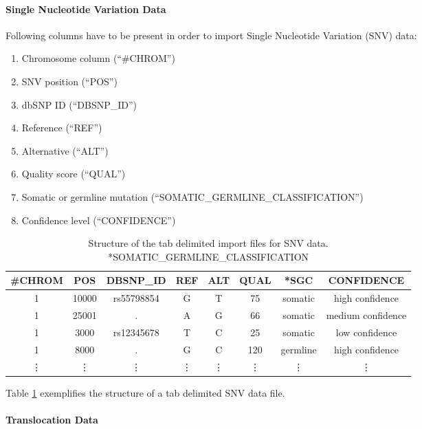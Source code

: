 \documentclass[11pt,final]{article}
\begin{document}
\paragraph{Single Nucleotide Variation Data}

Following columns have to be present in order to import Single Nucleotide
Variation (SNV) data:

\begin{enumerate}
  \item Chromosome column (``\#CHROM'')
  \item SNV position (``POS'')
  \item dbSNP ID (``DBSNP\_ID'')
  \item Reference (``REF'')
  \item Alternative (``ALT'')
  \item Quality score (``QUAL'')
  \item Somatic or germline mutation (``SOMATIC\_GERMLINE\_CLASSIFICATION'')
  \item Confidence level (``CONFIDENCE'')
\end{enumerate}

\begin{table}
	\centering
	\begin{tabular}[h]{|c|c|c|c|c|c|c|c|}
	  \hline
	  \#CHROM & POS & DBSNP\_ID & REF & ALT & QUAL & {*}SGC & CONFIDENCE \\ \hline
	 1 & 10000 & rs55798854 & G & T & 75 & somatic & high confidence\\
         1 & 25001 & . & A & G & 66 & somatic & medium confidence\\
         1 & 3000 & rs12345678 & T & C & 25 & somatic & low confidence\\
         1 & 8000 & . & G & C & 120 & germline & high confidence\\
	\vdots & \vdots & \vdots & \vdots & \vdots & \vdots & \vdots & \vdots \\
	\end{tabular}
	\caption{Structure of the tab delimited import files for SNV data.
	{*}SOMATIC\_GERMLINE\_CLASSIFICATION}
	\label{tab:tsv_snv}
\end{table}

Table \ref{tab:tsv_snv} exemplifies the structure of a tab delimited SNV data file.

\paragraph{Translocation Data}
\end{document}
